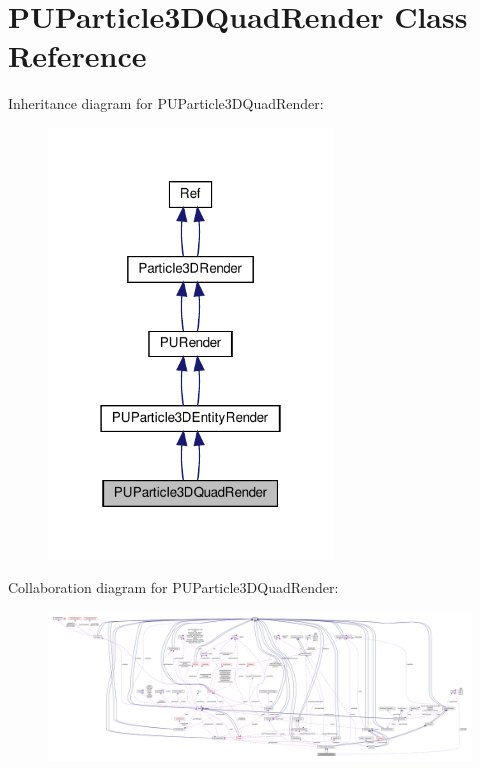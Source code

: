 \hypertarget{classPUParticle3DQuadRender}{}\section{P\+U\+Particle3\+D\+Quad\+Render Class Reference}
\label{classPUParticle3DQuadRender}


Inheritance diagram for P\+U\+Particle3\+D\+Quad\+Render\+:
\nopagebreak
\begin{figure}[H]
\begin{center}
\leavevmode
\includegraphics[width=214pt]{classPUParticle3DQuadRender__inherit__graph}
\end{center}
\end{figure}


Collaboration diagram for P\+U\+Particle3\+D\+Quad\+Render\+:
\nopagebreak
\begin{figure}[H]
\begin{center}
\leavevmode
\includegraphics[width=350pt]{classPUParticle3DQuadRender__coll__graph}
\end{center}
\end{figure}

